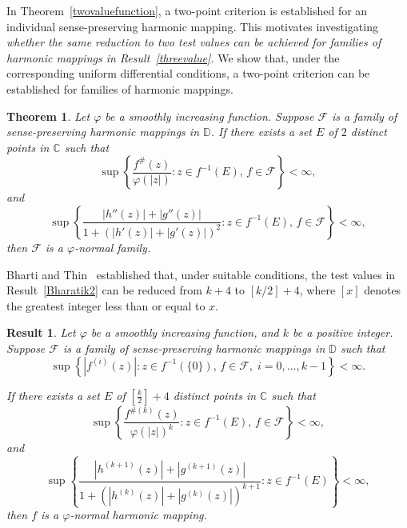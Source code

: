 \documentclass[10pt,a4paper]{amsart}
\numberwithin{equation}{section}
\newtheorem{theorem}{Theorem}[section]
\newtheorem{result}{Result}[section]
\begin{document}
In Theorem~\ref{twovaluefunction}, a two-point criterion is 
 established for an individual sense-preserving harmonic mapping. 
This motivates investigating {\it whether the same reduction to two 
test values can be achieved for families of harmonic mappings in 
 Result~\ref{threevalue}.} We show that, under the corresponding 
uniform differential conditions, a two-point criterion can be 
established for families of harmonic mappings.
 \begin{theorem}\label{twovaluefamily}
  Let $\varphi$ be a smoothly increasing function. 
  Suppose $\mathcal{F}$ is
   a family of sense-preserving harmonic mappings in 
   $\mathbb{D}$.
If there exists a set $E$ of $2$ distinct points 
in $\mathbb{C}$ such that
\begin{equation}\label{eq:1twovaluefamily}
\sup\left\{
\frac{f^\#(z)}{\varphi(|z|)}
:
z\in f^{-1}(E), \, f \in \mathcal{F}
\right\}
<\infty,
\end{equation}
and
\begin{equation}\label{eq:2twovaluefamily}
\sup\left\{
\frac{|h''(z)|+|g''(z)|}
{1+\left(|h'(z)|+|g'(z)|\right)^2}
:
z\in f^{-1}(E), \, f \in \mathcal{F}
\right\}
<\infty,
\end{equation}
then $\mathcal{F}$ is a $\varphi$-normal family.
\end{theorem}

Bharti and Thin~\cite[Thoerem 1.10]{bharatithin} established that, 
under suitable conditions, the test values in Result~\ref{Bharatik2} 
can be reduced from $k+4$ to $[k/2]+4$,  where $[x]$ 
denotes the greatest integer less than or equal to $x$.
 \begin{result}\label{bharti3}\cite[Theorem 1.10]{bharatithin}
   Let $\varphi$ be a smoothly increasing function, and
$k$ be a positive integer. Suppose $\mathcal{F}$ is a family 
of sense-preserving harmonic mappings in $\mathbb{D}$ such that
\begin{equation}
\sup\left\{
|f^{(i)}(z)|:
z\in f^{-1}(\{0\}),\, f \in \mathcal{F}, \;
i=0,\ldots,k-1
\right\}<\infty.
\end{equation}

If there exists a set $E$ of $\left[\frac{k}{2}\right]+4$
 distinct points in $\mathbb{C}$ such that
\begin{equation}
\sup\left\{
\frac{f^{\#(k)}(z)}{\varphi(|z|)^k}
:
z\in f^{-1}(E), \, f \in \mathcal{F}
\right\}
<\infty,
\end{equation}
and
\begin{equation}
\sup\left\{
\frac{|h^{(k+1)}(z)|+|g^{(k+1)}(z)|}
{1+\left(|h^{(k)}(z)|+|g^{(k)}(z)|\right)^{k+1}}
:
z\in f^{-1}(E)
\right\}
<\infty,
\end{equation}
then $f$ is a $\varphi$-normal harmonic mapping.
 \end{result}
 
\end{document}
